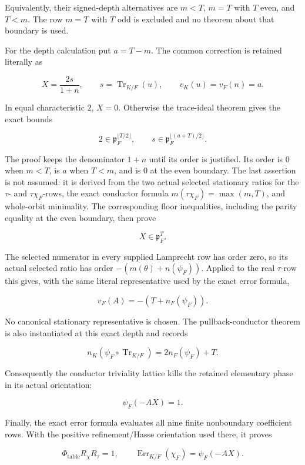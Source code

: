 \begin{theorem}
Equivalently, their signed-depth alternatives are \(m<T\), \(m=T\) with
\(T\) even, and \(T<m\).  The row \(m=T\) with \(T\) odd is excluded and no
theorem about that boundary is used.

For the depth calculation put \(a=T-m\).  The common correction is retained
literally as

\[
  X=\frac{2s}{1+n},\qquad s=\operatorname{Tr}_{K/F}(u),
  \qquad v_K(u)=v_F(n)=a.
\]

In equal characteristic \(2\), \(X=0\).  Otherwise the trace-ideal theorem
gives the exact bounds

\[
  2\in\mathfrak p_F^{\lfloor T/2\rfloor},\qquad
  s\in\mathfrak p_F^{\lfloor(a+T)/2\rfloor}.
\]

The proof keeps the denominator \(1+n\) until its order is justified.  Its
order is \(0\) when \(m<T\), is \(a\) when \(T<m\), and is \(0\) at the even
boundary.  The last assertion is not assumed: it is derived from the two
actual selected stationary ratios for the \(\tau\)- and
\(\tau\chi_F\)-rows, the exact conductor formula
\(m(\tau\chi_F)=\max(m,T)\), and whole-orbit minimality.  The corresponding
floor inequalities, including the parity equality at the even boundary,
then prove

\[
  X\in\mathfrak p_F^T.
\]

The selected numerator in every supplied Lamprecht row has order zero, so
its actual selected ratio has order \(-(m(\theta)+n(\psi_F))\).  Applied to
the real \(\tau\)-row this gives, with the same literal representative used
by the exact error formula,

\[
  v_F(A)=-(T+n_F(\psi_F)).
\]

No canonical stationary representative is chosen.  The pullback-conductor
theorem is also instantiated at this exact depth and records

\[
 n_K(\psi_F\circ\operatorname{Tr}_{K/F})
   =2n_F(\psi_F)+T.
\]

Consequently the conductor triviality lattice kills the retained elementary
phase in its actual orientation:

\[
  \psi_F(-AX)=1.
\]

Finally, the exact error formula evaluates all nine finite nonboundary
coefficient rows.  With the positive refinement/Hasse orientation used
there, it proves

\[
  \Phi_{\mathrm{table}}R_\chi R_\tau=1,
  \qquad
  \operatorname{Err}_{K/F}(\chi_F)=\psi_F(-AX).
\]


\end{theorem}

